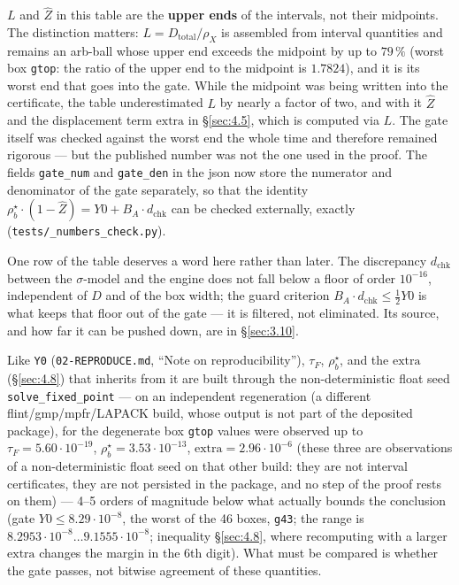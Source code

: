 $L$ and $\widehat{Z}$ in this table are the \textbf{upper ends} of the intervals, not their midpoints. The distinction matters: $L = D_{\mathrm{total}}/\rho_{X}$ is assembled from interval quantities and remains an arb-ball whose upper end exceeds the midpoint by up to $79\,\%$ (worst box \texttt{gtop}: the ratio of the upper end to the midpoint is $1.7824$), and it is its worst end that goes into the gate. While the midpoint was being written into the certificate, the table underestimated $L$ by nearly a factor of two, and with it $\widehat{Z}$ and the displacement term $\mathrm{extra}$ in \S\ref{sec:4.5}, which is computed via $L$. The gate itself was checked against the worst end the whole time and therefore remained rigorous --- but the published number was not the one used in the proof. The fields \texttt{gate\_num} and \texttt{gate\_den} in the json now store the numerator and denominator of the gate separately, so that the identity $\rho^{\star}_{b}\cdot(1-\widehat{Z}) = Y0 + B_{A}\cdot d_{\mathrm{chk}}$ can be checked externally, exactly (\texttt{tests/\allowbreak \_\allowbreak numbers\_\allowbreak check.py}).

One row of the table deserves a word here rather than later. The discrepancy
$d_{\mathrm{chk}}$ between the $\sigma$-model and the engine does not fall below
a floor of order $10^{-16}$, independent of $D$ and of the box width; the guard
criterion $B_{A}\cdot d_{\mathrm{chk}} \le \tfrac{1}{2}Y0$ is what keeps that
floor out of the gate --- it is filtered, not eliminated. Its source, and how
far it can be pushed down, are in \S\ref{sec:3.10}.

Like \texttt{Y0} (\texttt{02-\allowbreak REPRODUCE.md}, ``Note on reproducibility''), $\tau_{F}$, $\rho^{\star}_{b}$, and the $\mathrm{extra}$ (\S\ref{sec:4.8}) that inherits from it are built through the non-deterministic float seed \texttt{solve\_\allowbreak fixed\_\allowbreak point} --- on an independent regeneration (a different flint/gmp/mpfr/LAPACK build, whose output is not part of the deposited package), for the degenerate box \texttt{gtop} values were observed up to $\tau_{F} = 5.60\cdot 10^{-19}$, $\rho^{\star}_{b} = 3.53\cdot 10^{-13}$, $\mathrm{extra} = 2.96\cdot 10^{-6}$ (these three are observations of a non-deterministic float seed on that other build: they are not interval certificates, they are not persisted in the package, and no step of the proof rests on them) --- 4--5 orders of magnitude below what actually bounds the conclusion (gate $Y0\le 8.29\cdot 10^{-8}$, the worst of the 46 boxes, \texttt{g43}; the range is $8.2953\cdot 10^{-8}\ldots9.1555\cdot 10^{-8}$; inequality \S\ref{sec:4.8}, where recomputing with a larger $\mathrm{extra}$ changes the margin in the 6th digit). What must be compared is whether the gate passes, not bitwise agreement of these quantities.

